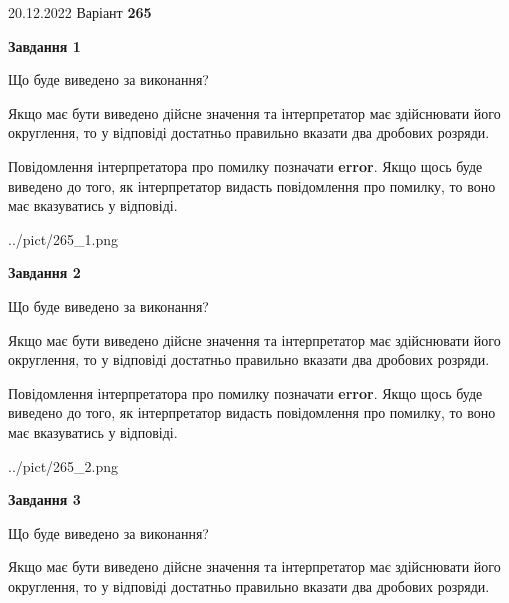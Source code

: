 \documentclass[12pt, ukrainian]{article}
\begin{document}
{20.12.2022 Варіант \No \textbf { 265 }\par}
{
\begin {Large}

{\begin {center}\textbf{Завдання 1}\end {center}}\par
Що буде виведено за виконання? \par

Якщо має бути виведено дійсне значення та інтерпретатор має здійснювати його округлення, 
то у відповіді достатньо правильно вказати два дробових розряди.

Повідомлення інтерпретатора про помилку позначати \textbf{error}.
Якщо щось буде виведено до того, як інтерпретатор видасть повідомлення про помилку, 
то воно має вказуватись у відповіді. \par

\begin{center}
	{../pict/265_1.png}
\end{center}
\newpage

{\begin {center}\textbf{Завдання 2}\end {center}}\par
Що буде виведено за виконання? \par

Якщо має бути виведено дійсне значення та інтерпретатор має здійснювати його округлення, 
то у відповіді достатньо правильно вказати два дробових розряди.

Повідомлення інтерпретатора про помилку позначати \textbf{error}.
Якщо щось буде виведено до того, як інтерпретатор видасть повідомлення про помилку, 
то воно має вказуватись у відповіді. \par

\begin{center}
	{../pict/265_2.png}
\end{center}
\newpage

{\begin {center}\textbf{Завдання 3}\end {center}}\par
Що буде виведено за виконання? \par

Якщо має бути виведено дійсне значення та інтерпретатор має здійснювати його округлення, 
то у відповіді достатньо правильно вказати два дробових розряди.


\end{Large}}
\end{document}
